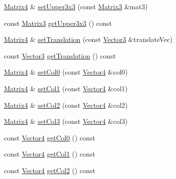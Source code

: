 \begin{DoxyCompactItemize}
\item 
\hyperlink{classVectormath_1_1Aos_1_1Matrix4}{Matrix4} \& \hyperlink{classVectormath_1_1Aos_1_1Matrix4_a796651e64320a209ca5b386c3de3af9a}{set\-Upper3x3} (const \hyperlink{classVectormath_1_1Aos_1_1Matrix3}{Matrix3} \&mat3)
\item 
const \hyperlink{classVectormath_1_1Aos_1_1Matrix3}{Matrix3} \hyperlink{classVectormath_1_1Aos_1_1Matrix4_a03bd8e35ef74921b486b9caaa5917fce}{get\-Upper3x3} () const 
\item 
\hyperlink{classVectormath_1_1Aos_1_1Matrix4}{Matrix4} \& \hyperlink{classVectormath_1_1Aos_1_1Matrix4_a8fc9714a1b77613027bde0e9b5cafe14}{set\-Translation} (const \hyperlink{classVectormath_1_1Aos_1_1Vector3}{Vector3} \&translate\-Vec)
\item 
const \hyperlink{classVectormath_1_1Aos_1_1Vector3}{Vector3} \hyperlink{classVectormath_1_1Aos_1_1Matrix4_a65c82c56c6c9a60604f587a1ae1ea889}{get\-Translation} () const 
\item 
\hyperlink{classVectormath_1_1Aos_1_1Matrix4}{Matrix4} \& \hyperlink{classVectormath_1_1Aos_1_1Matrix4_a02cbef72b8199d1484b377a460442681}{set\-Col0} (const \hyperlink{classVectormath_1_1Aos_1_1Vector4}{Vector4} \&col0)
\item 
\hyperlink{classVectormath_1_1Aos_1_1Matrix4}{Matrix4} \& \hyperlink{classVectormath_1_1Aos_1_1Matrix4_a8db69ef5f587c3328ce96f7292e347f4}{set\-Col1} (const \hyperlink{classVectormath_1_1Aos_1_1Vector4}{Vector4} \&col1)
\item 
\hyperlink{classVectormath_1_1Aos_1_1Matrix4}{Matrix4} \& \hyperlink{classVectormath_1_1Aos_1_1Matrix4_a979b28e8e6a622fd622cde6656099bb1}{set\-Col2} (const \hyperlink{classVectormath_1_1Aos_1_1Vector4}{Vector4} \&col2)
\item 
\hyperlink{classVectormath_1_1Aos_1_1Matrix4}{Matrix4} \& \hyperlink{classVectormath_1_1Aos_1_1Matrix4_a73da9686b802d99b4232cb187e1d4aeb}{set\-Col3} (const \hyperlink{classVectormath_1_1Aos_1_1Vector4}{Vector4} \&col3)
\item 
const \hyperlink{classVectormath_1_1Aos_1_1Vector4}{Vector4} \hyperlink{classVectormath_1_1Aos_1_1Matrix4_a70063e1461d582bf7af3242f14fef9c2}{get\-Col0} () const 
\item 
const \hyperlink{classVectormath_1_1Aos_1_1Vector4}{Vector4} \hyperlink{classVectormath_1_1Aos_1_1Matrix4_af2a346e5671e137e665abf428ea3fe37}{get\-Col1} () const 
\item 
const \hyperlink{classVectormath_1_1Aos_1_1Vector4}{Vector4} \hyperlink{classVectormath_1_1Aos_1_1Matrix4_a578e25e020f032f6797d091d60bd666c}{get\-Col2} () const 

\end{DoxyCompactItemize}
